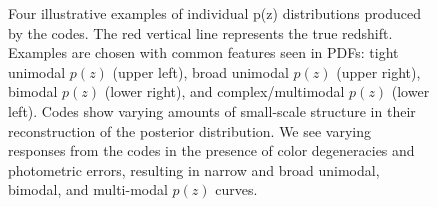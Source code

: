 \begin{figure}
\caption{Four illustrative examples of individual p(z) distributions produced by the codes.  The red vertical line represents the true redshift.  Examples are chosen with common features seen in PDFs: tight unimodal $p(z)$ (upper left), broad unimodal $p(z)$ (upper right), bimodal $p(z)$ (lower right), and complex/multimodal $p(z)$ (lower left).  Codes show varying amounts of small-scale structure in their reconstruction of the posterior distribution.  We see varying responses from the codes in the presence of color degeneracies and photometric errors, resulting in narrow and broad unimodal, bimodal, and multi-modal $p(z)$ curves.} \label{fig:pz_examples}
\end{figure}


